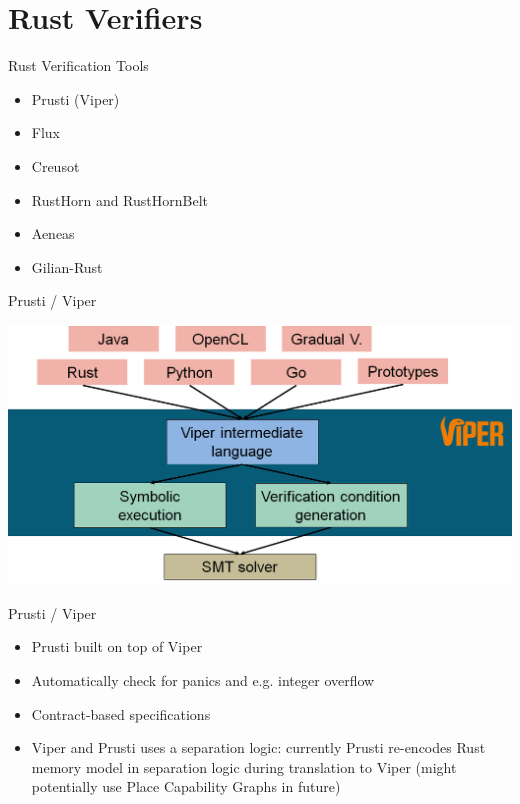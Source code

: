 \documentclass{beamer}
\begin{document}
\section{Rust Verifiers}

\begin{frame}{Rust Verification Tools}
\begin{itemize} 
\item Prusti (Viper)
\item Flux
\item Creusot
\item RustHorn and RustHornBelt
\item Aeneas
\item Gilian-Rust
\end{itemize} 
\end{frame}

\begin{frame}{Prusti / Viper} 
\begin{center}
\includegraphics[scale=0.3]{pictures/viper.png}
\end{center}
\end{frame}


\begin{frame}{Prusti / Viper} 
\begin{itemize}
\item Prusti built on top of Viper
\item Automatically check for panics and e.g. integer overflow
\item Contract-based specifications
\item Viper and Prusti uses a separation logic: currently Prusti re-encodes Rust memory model in separation logic during translation to Viper (might potentially use Place Capability Graphs in future)
\end{itemize}
\end{frame}
\end{document}
